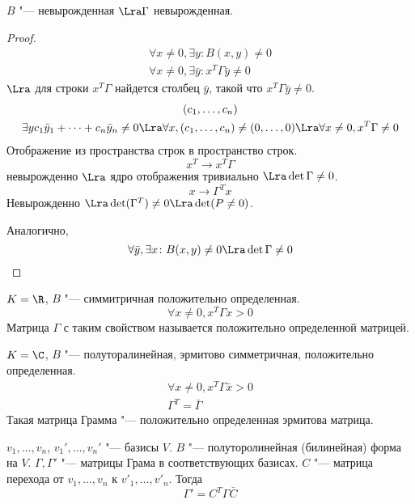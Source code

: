 \begin{lemma}
	$B$ "--- невырожденная $\Lra \Gamma$ невырожденная.
\end{lemma}
\begin{proof}
	\begin{gather*}
		\forall x \ne 0, \exists y\colon B(x, y) \ne 0 \\
		\forall x \ne 0, \exists \bar y\colon x^T\Gamma\bar y \ne 0
	\end{gather*}
	$\Lra$ для строки $x^{T}\Gamma$ найдется столбец $\bar y$, такой что
	$x^T \Gamma \bar y \ne 0$.
	\begin{gather*}
		(c_1, \dots, c_n) \\
		\exists y c_1\bar y_1 + \dots + c_n \bar y_n \ne 0
		\Lra \forall x, (c_1, \dots, c_n) \ne (0, \dots, 0)
		\Lra \forall x \ne 0, x^T\Gamma \ne 0
	\end{gather*}
	Отображение из пространства строк в пространство строк.
	\[ x^{T} \to x^T \Gamma \]
	невырожденно $\Lra$ ядро отображения тривиально $\Lra \det \Gamma \ne 0$.
	\[ x \to \Gamma^{T} x \]
	Невырожденно $\Lra \det(\Gamma^T) \ne 0 \Lra \det(P \ne 0)$.

	Аналогично,
	\[ \forall \bar y, \exists x\colon B(x, y) \ne 0 \Lra \det \Gamma \ne 0 \]
\end{proof}

\begin{Def}
	$K = \R$, $B$ "--- симмитричная положительно определенная.
	\[ \forall x \ne 0, x^{T}\Gamma x > 0 \]
	Матрица $\Gamma$ с таким свойством называется положительно определенной матрицей.
\end{Def}
\begin{Def}
	$K = \C$, $B$ "--- полуторалинейная, эрмитово симметричная, положительно определенная.
	\begin{gather*}
		\forall x \ne 0, x^T \Gamma \bar x > 0 \\
		\Gamma^T = \bar \Gamma
	\end{gather*}
	Такая матрица Грамма "--- положительно определенная эрмитова матрица.
\end{Def}

\begin{lemma}
	$v_1, \dots, v_n$, $v_1', \dots, v_n'$ "--- базисы $V$.
	$B$ "--- полуторолинейная (билинейная) форма на $V$.
	$\Gamma, \Gamma'$ "--- матрицы Грама в соответствующих базисах.
	$C$ "--- матрица перехода от $v_1, \dots, v_n$ к  $v'_1, \dots, v'_n$.
	Тогда
	\[ \Gamma' = C^T \Gamma \bar C \]
\end{lemma}

